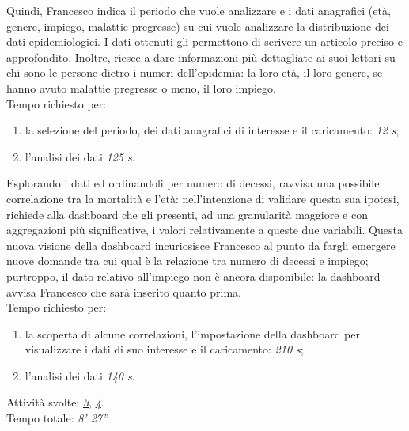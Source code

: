 \noindent
Quindi, Francesco indica il periodo che vuole analizzare e i dati anagrafici (età, genere, impiego, malattie pregresse) su cui vuole analizzare la distribuzione dei dati epidemiologici.
I dati ottenuti gli permettono di scrivere un articolo preciso e approfondito. Inoltre, riesce a dare informazioni più dettagliate ai suoi lettori su chi sono le persone dietro i numeri dell'epidemia: la loro età, il loro genere, se hanno avuto malattie pregresse o meno, il loro impiego.\\
Tempo richiesto per:
\begin{enumerate}
    \item la selezione del periodo, dei dati anagrafici di interesse e il caricamento: \textit{12 s};
    \item l'analisi dei dati \textit{125 s}.
\end{enumerate}

\noindent
Esplorando i dati ed ordinandoli per numero di decessi, ravvisa una possibile correlazione tra la mortalità e l'età: nell'intenzione di validare questa sua ipotesi, richiede alla dashboard che gli presenti, ad una granularità maggiore e con aggregazioni più significative, i valori relativamente a queste due variabili. 
Questa nuova visione della dashboard incuriosisce Francesco al punto da fargli emergere nuove domande tra cui qual è la relazione tra numero di decessi e impiego; purtroppo, il dato relativo all'impiego non è ancora disponibile: la dashboard avvisa Francesco che sarà inserito quanto prima.\\
Tempo richiesto per:
\begin{enumerate}
    \item la scoperta di alcune correlazioni, l'impostazione della dashboard per visualizzare i dati di suo interesse e il caricamento: \textit{210 s};
    \item l'analisi dei dati \textit{140 s}.
\end{enumerate}

\noindent
Attività svolte: \hyperref[itm:3]{\textit{3}}, \hyperref[itm:4]{\textit{4}}.\\ 
Tempo totale: \textit{8' 27''} 

